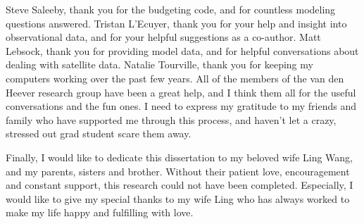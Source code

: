 \begin{acknowledgements}
Steve Saleeby, thank you for the budgeting code, and for countless modeling questions answered.  Tristan L'Ecuyer, thank you for your help and insight into observational data, and for your helpful suggestions as a co-author.  Matt Lebsock, thank you for providing model data, and for helpful conversations about dealing with satellite data.  Natalie Tourville, thank you for keeping my computers working over the past few years.  All of the members of the van den Heever research group have been a great help, and I think them all for the useful conversations and the fun ones.  I need to express my gratitude to my friends and family who have supported me through this process, and haven't let a crazy, stressed out grad student scare them away.

Finally, I would like to dedicate this dissertation to my beloved wife Ling Wang, and my parents, sisters and brother. Without their patient love, encouragement and constant support, this research could not have been completed. Especially, I would like to give my special thanks to my wife Ling who has always worked to make my life happy and fulfilling with love.
\end{acknowledgements}
